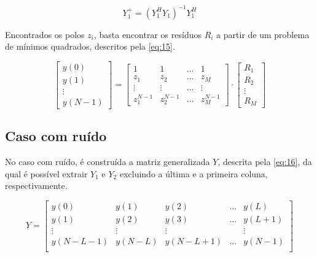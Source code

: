 \documentclass[12pt]{article}
\begin{document}
\begin{equation} \label{eq:14}
    Y_1^+= (Y_1^H Y_1)^{-1}Y_1^H
\end{equation}

Encontrados os polos $z_i$, basta encontrar os resíduos $R_i$ a partir de um problema de mínimos quadrados, descritos pela \autoref{eq:15}.

\begin{equation} \label{eq:15}
    \begin{bmatrix} y(0) \\
    y(1) \\
    \vdots \\
    y(N-1)
    \end{bmatrix} = 
    \begin{bmatrix} 1 & 1 & \dots & 1 \\
    z_1 & z_2 & \dots & z_M \\
    \vdots & \vdots & \dots & \vdots \\
    z_1^{N-1} & z_2^{N-1} & \dots & z_M^{N-1}
    \end{bmatrix} \cdot 
    \begin{bmatrix}
    R_1 \\
    R_2 \\
    \vdots \\
    R_{M}
    \end{bmatrix}
\end{equation}

\subsection{Caso com ruído}

No caso com ruído, é construída a matriz generalizada $Y$, descrita pela \autoref{eq:16}, da qual é possível extrair $Y_1$ e $Y_2$ excluindo a 
última e a primeira coluna, respectivamente. 

\begin{equation} \label{eq:16}
    Y = \begin{bmatrix} y(0) &y(1) & y(2) & \dots & y(L) \\
                        y(1) & y(2) & y(3) & \dots & y(L + 1) \\
                        \vdots & \vdots & \vdots & & \vdots \\
                        y(N - L -1) & y(N-L) & y(N - L + 1) & \dots & y(N-1) \\
    \end{bmatrix}
\end{equation}
\end{document}
